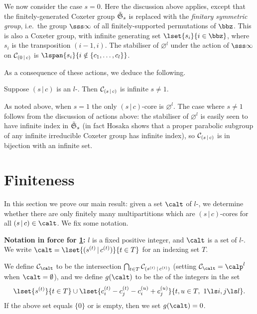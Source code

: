 \documentclass[a4paper, 11pt, twoside]{article}
\begin{document}
We now consider the case $s=0$. Here the discussion above applies, except that the finitely-generated Coxeter group $\tilde{\mathfrak S}_ s$ is replaced with the \emph{finitary symmetric group}, i.e.\ the group $\sss\infty$ of all finitely-supported permutations of $\bbz$. This is also a Coxeter group, with infinite generating set $\lset{s_i}{i\in\bbz}$, where $s_i$ is the transposition $(i-1,i)$. The stabiliser of $\varnothing^l$ under the action of $\sss\infty$ on $\mathcal{C}_{(0\,|\,c)}$ is $\lspan{s_i}{i\notin\{c_1,\dots,c_l\}}$.

As a consequence of these actions, we deduce the following.

\begin{propn}\label{infcores}
Suppose $(s\,|\,c)$ is an $l$-\mcd. Then $\mathcal{C}_{(s\,|\,c)}$ is infinite \iff $s\neq1$.
\end{propn}

\begin{pf}
As noted above, when $s=1$ the only $(s\,|\,c)$-core is $\varnothing^l$. The case where $s\neq1$ follows from the discussion of actions above: the stabiliser of $\varnothing^l$ is easily seen to have infinite index in $\tilde{\mathfrak S}_ s$ (in fact Hosaka \cite[Theorem 3.1]{hos} shows that a proper parabolic subgroup of any infinite irreducible Coxeter group has infinite index), so $\mathcal{C}_{(s\,|\,c)}$ is in bijection with an infinite set.
\end{pf}

\section{Finiteness}\label{finitenesssec}

In this section we prove our main result: given a set $\calt$ of $l$-\mcds, we determine whether there are only finitely many multipartitions which are $(s\,|\,c)$-cores for all $(s\,|\,c)\in\calt$. We fix some notation.

\smallskip
\begin{mdframed}[innerleftmargin=3pt,innerrightmargin=3pt,innertopmargin=3pt,innerbottommargin=3pt,roundcorner=5pt,innermargin=-3pt,outermargin=-3pt]
\noindent\textbf{Notation in force for \cref{finitenesssec}:}
$l$ is a fixed positive integer, and $\calt$ is a set of $l$-\mcds. We write $\calt=\lset{(\sof st\,|\,\sof ct)}{t\in T}$ for an indexing set $T$.

We define $\smc\calt$ to be the intersection $\bigcap_{t\in T}\mathcal{C}_{(s^{(t)}\,|\,c^{(t)})}$ (setting $\smc\calt=\calp^l$ when $\calt=\emptyset$), and we define $g(\calt)$ to be the \gcd of the integers in the set
\[
\lset{\sof st}{t\in T}\cup\lset{\sof ct_i-\sof ct_j-\sof cu_i+\sof cu_j}{t,u\in T,\ 1\ls i,j\ls l}.
\]
If the above set equals $\{0\}$ or is empty, then we set $g(\calt)=0$.
\end{mdframed}
\end{document}

